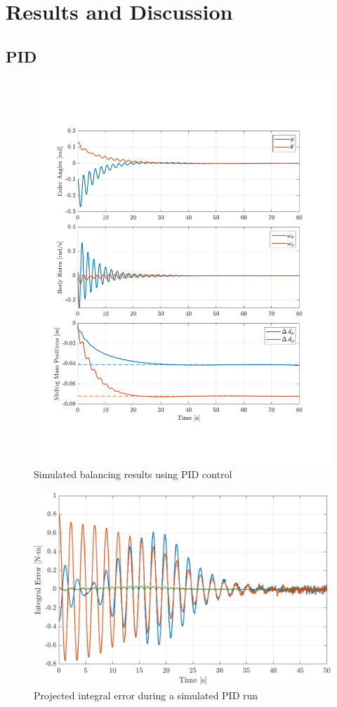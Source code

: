 \chapter{Results and Discussion}

\section{PID}
\begin{figure}[!ht]
    \centering
    \includegraphics[width=\linewidth]{plots/PID_sim_results.pdf}
    \caption{Simulated balancing results using PID control}
\end{figure}

\begin{figure}[!ht]
    \centering
    \includegraphics[width=\linewidth]{plots/PID_sim_integral_error.png}
    \caption{Projected integral error during a simulated PID run}
\end{figure}

